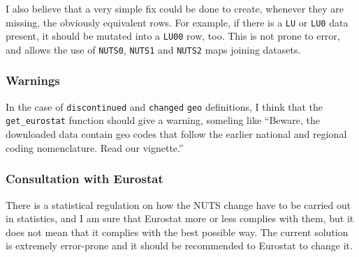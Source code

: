 \documentclass[]{article}
\begin{document}
I also believe that a very simple fix could be done to create, whenever
they are missing, the obviously equivalent rows. For example, if there
is a \texttt{LU} or \texttt{LU0} data present, it should be mutated into
a \texttt{LU00} row, too. This is not prone to error, and allows the use
of \texttt{NUTS0}, \texttt{NUTS1} and \texttt{NUTS2} maps joining
datasets.

\hypertarget{warnings}{%
\subsubsection{Warnings}\label{warnings}}

In the case of \texttt{discontinued} and \texttt{changed} \texttt{geo}
definitions, I think that the \texttt{get\_eurostat} function should
give a warning, someling like ``Beware, the downloaded data contain geo
codes that follow the earlier national and regional coding nomenclature.
Read our vignette.''

\hypertarget{consultation-with-eurostat}{%
\subsubsection{Consultation with
Eurostat}\label{consultation-with-eurostat}}

There is a statistical regulation on how the NUTS change have to be
carried out in statistics, and I am sure that Eurostat more or less
complies with them, but it does not mean that it complies with the best
possible way. The current solution is extremely error-prone and it
should be recommended to Eurostat to change it.
\end{document}
